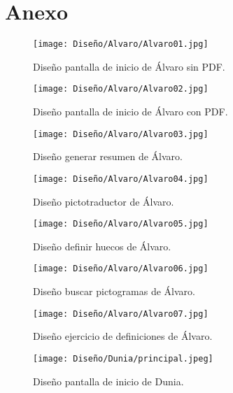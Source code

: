 \chapter{Anexo}
\label{cap:anexo}

\begin{figure}[ht!]
  \centering
  \texttt{[image: Diseño/Alvaro/Alvaro01.jpg]}
  \caption{Diseño pantalla de inicio de Álvaro sin PDF.}
  \label{fig:disenyoAlvaro01}
\end{figure}

\begin{figure}[ht!]
  \centering
  \texttt{[image: Diseño/Alvaro/Alvaro02.jpg]}
  \caption{Diseño pantalla de inicio de Álvaro con PDF.}
  \label{fig:disenyoAlvaro02}
\end{figure}

\begin{figure}[ht!]
  \centering
  \texttt{[image: Diseño/Alvaro/Alvaro03.jpg]}
  \caption{Diseño generar resumen de Álvaro.}
  \label{fig:disenyoAlvaro03}
\end{figure}

\begin{figure}[ht!]
  \centering
  \texttt{[image: Diseño/Alvaro/Alvaro04.jpg]}
  \caption{Diseño pictotraductor de Álvaro.}
  \label{fig:disenyoAlvaro04}
\end{figure}

\begin{figure}[ht!]
  \centering
  \texttt{[image: Diseño/Alvaro/Alvaro05.jpg]}
  \caption{Diseño definir huecos de Álvaro.}
  \label{fig:disenyoAlvaro05}
\end{figure}

\begin{figure}[ht!]
  \centering
  \texttt{[image: Diseño/Alvaro/Alvaro06.jpg]}
  \caption{Diseño buscar pictogramas de Álvaro.}
  \label{fig:disenyoAlvaro06}
\end{figure}

\begin{figure}[ht!]
  \centering
  \texttt{[image: Diseño/Alvaro/Alvaro07.jpg]}
  \caption{Diseño ejercicio de definiciones de Álvaro.}
  \label{fig:disenyoAlvaro07}
\end{figure}

\begin{figure}[ht!]
  \centering
  \texttt{[image: Diseño/Dunia/principal.jpeg]}
  \caption{Diseño pantalla de inicio de Dunia.}
  \label{dunia1}
\end{figure}

